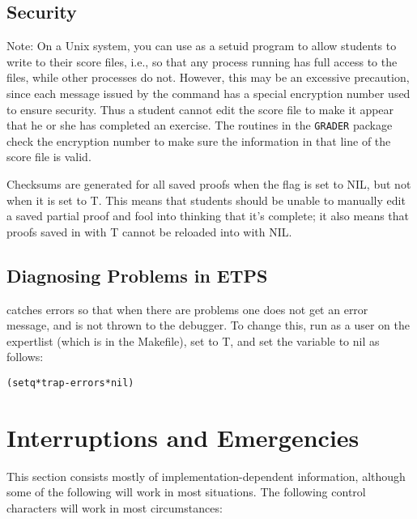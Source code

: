 \subsection{Security}

Note: On a Unix system, you can use {\ETPS} as a setuid program to allow
students to write to their score files, i.e., so that any process
running {\ETPS} has full access to the files, while other processes do
not.  However, this may be an excessive precaution, since each message
issued by the {\ETPS}  command has a special
encryption number used to ensure security.  Thus a student cannot edit
the score file to make it appear that he or she has completed an
exercise.  The routines in the {\tt GRADER} package check the encryption
number to make sure the information in that line of the score file is
valid.

Checksums are generated for all saved proofs
when the  flag is set to NIL, but not when it is set to T.
This means that students should be unable to manually edit a saved partial proof
and fool {\ETPS} into thinking that it's complete; it also means that proofs
saved in {\TPS} with  T cannot be reloaded into {\ETPS}
with  NIL.


\subsection{Diagnosing Problems in ETPS}

{\ETPS} catches errors so that when there are problems one does
not get an error message, and is not thrown to the debugger.
To change this, run {\ETPS} as a user on the expertlist (which is in the Makefile),
set  to T, and set the variable  to
nil as follows:
\begin{alltt}
(setq *trap-errors* nil)
\end{alltt}

\section{Interruptions and Emergencies}

This section consists mostly of implementation-dependent information,
although some of the following will work in most situations.
The following control characters will work in most circumstances:

